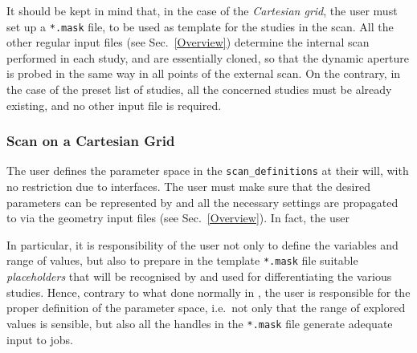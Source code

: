 It should be kept in mind that, in the case of the \emph{Cartesian grid},
the user must set up a \texttt{*.mask} file, to be used as template for
the studies in the scan. All the other regular input files
(see Sec.~\ref{Overview}) determine the
internal scan performed in each study, and are essentially cloned,
so that the dynamic aperture is probed in the same way
in all points of the external scan. On the contrary,
in the case of the preset list of studies, all the concerned
studies must be already existing, and no other input file is
required.

\subsubsection{Scan on a Cartesian Grid}
The user defines the parameter space in the \texttt{scan\_definitions}
at their will, with no restriction due to interfaces. The user must
make sure that the desired parameters can be represented by \MADX{}
and all the necessary settings are propagated to \SIXTRACK{} via
the geometry input files (see Sec.~\ref{Overview}).
In fact, the user 

In particular, it is responsibility of the
user not only to define the variables and range of values,
but also to prepare in the template \texttt{*.mask} file
suitable \emph{placeholders} that will be recognised by
\SIXDESK{} and used for differentiating the various studies.
Hence, contrary to what done normally in
\SIXDESK{}, the user is responsible for the proper definition
of the parameter space, i.e.~not only that the range of explored
values is sensible, but also all the handles in the \texttt{*.mask}
file generate adequate input to \SIXTRACK{} jobs.


